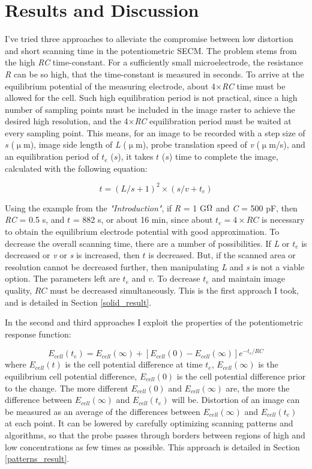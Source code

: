 \chapter{Results and Discussion}
I've tried three approaches to alleviate the compromise between low distortion and short scanning time in the potentiometric SECM.
The problem stems from the high \emph{RC} time-constant.
For a sufficiently small microelectrode, the resistance \emph{R} can be so high, that the time-constant is measured in seconds.
To arrive at the equilibrium potential of the measuring electrode, about 4$\times$\emph{RC} time must be allowed for the cell.
Such high equilibration period is not practical, since a high number of sampling points must be included in the image raster to achieve the desired high resolution, and the 4$\times$\emph{RC} equilibration period must be waited at every sampling point.
This means, for an image to be recorded with a step size of \emph{s} ($\upmu$m), image side length of \emph{L} ($\upmu$m), probe translation speed of \emph{v} ($\upmu$m/s), and an equilibration period of $t_e$ ($s$), it takes $t$ ($s$) time to complete the image, calculated with the following equation:

\begin{equation}
\label{eq:scantime}
	t = (L/s+1)^{2}\times(s/v + t_e)
\end{equation}

Using the example from the \emph{"Introduction"}, if \emph{R} = 1 G$\ohm$ and \emph{C} = 500 pF, then \emph{RC} = 0.5 s, and $t$ = 882 s, or about 16 min, since about $t_e = 4 \times RC$ is necessary to obtain the equilibrium electrode potential with good approximation.
To decrease the overall scanning time, there are a number of possibilities.
If \emph{L} or $t_e$ is decreased or \emph{v} or \emph{s} is increased, then $t$ is decreased.
But, if the scanned area or resolution cannot be decreased further, then manipulating \emph{L} and \emph{s} is not a viable option.
The parameters left are $t_e$ and $v$.
To decrease $t_e$ and maintain image quality, $RC$ must be decreased simultaneously.
This is the first approach I took, and is detailed in Section \ref{solid_result}.

In the second and third approaches I exploit the properties of the potentiometric response function:

\begin{equation}
\label{eq:rc}
        E_{cell}(t_{e}) = E_{cell}(\infty) + [E_{cell}(0) - E_{cell}(\infty)]e^{-t_{e}/RC}
\end{equation}
where $E_{cell}(t)$ is the cell potential difference at time $t_{e}$, $E_{cell}(\infty)$ is the equilibrium cell potential difference, $E_{cell}(0)$ is the cell potential difference prior to the change.
The more different $E_{cell}(0)$ and $E_{cell}(\infty)$ are, the more the difference between $E_{cell}(\infty)$ and $E_{cell}(t_{e})$ will be.
Distortion of an image can be measured as an average of the differences between $E_{cell}(\infty)$ and $E_{cell}(t_{e})$ at each point.
It can be lowered by carefully optimizing scanning patterns and algorithms, so that the probe passes through borders between regions of high and low concentrations as few times as possible.
This approach is detailed in Section \ref{patterns_result}.

